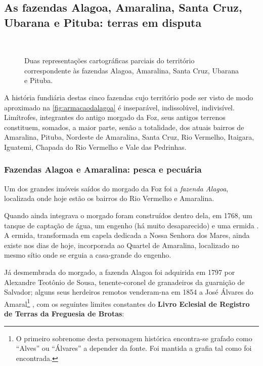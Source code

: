 \subsection{As fazendas Alagoa, Amaralina, Santa Cruz, Ubarana e Pituba: terras em disputa}\label{subsec:alagoaamaralina}

\begin{figure}[!htp]
\centering
{}
\  %
\caption{Duas representações cartográficas parciais do território correspondente às fazendas Alagoa, Amaralina, Santa Cruz, Ubarana e Pituba.}
\label{fig:armacaodalagoa}
\end{figure}

A história fundiária destas cinco fazendas cujo território pode ser visto de modo aproximado na \autoref{fig:armacaodalagoa} é inseparável, indissolúvel, indivisível. Limítrofes, integrantes do antigo morgado da Foz, seus antigos terrenos constituem, somados, a maior parte, senão a totalidade, dos atuais bairros de Amaralina, Pituba, Nordeste de Amaralina, Santa Cruz, Rio Vermelho, Itaigara, Iguatemi, Chapada do Rio Vermelho e Vale das Pedrinhas.

\subsubsection{Fazendas Alagoa e Amaralina: pesca e pecuária}

Um dos grandes imóveis saídos do morgado da Foz foi a \textit{fazenda Alagoa}, localizada onde hoje estão os bairros do Rio Vermelho e Amaralina.

Quando ainda integrava o morgado foram construídos dentro dela, em 1768, um tanque de captação de água, um engenho (há muito desaparecido) e uma ermida \cite[p.~118]{campos_alagoa_1942}. A ermida, transformada em capela dedicada a Nossa Senhora dos Mares, ainda existe nos dias de hoje, incorporada ao Quartel de Amaralina, localizado no mesmo sítio onde se erguia a casa-grande do engenho.

Já desmembrada do morgado, a fazenda Alagoa foi adquirida em 1797 por Alexandre Teotônio de Sousa, tenente-coronel de granadeiros da guarnição de Salvador; alguns seus herdeiros remotos venderam-na em 1854 a José Álvares do Amaral\footnote{O primeiro sobrenome desta personagem histórica encontra-se grafado como ``Alves'' ou ``Álvares'' a depender da fonte. Foi mantida a grafia tal como foi encontrada.} \cite[p.~118]{campos_alagoa_1942}, com os seguintes limites constantes do \textbf{Livro Eclesial de Registro de Terras da Freguesia de Brotas}:

